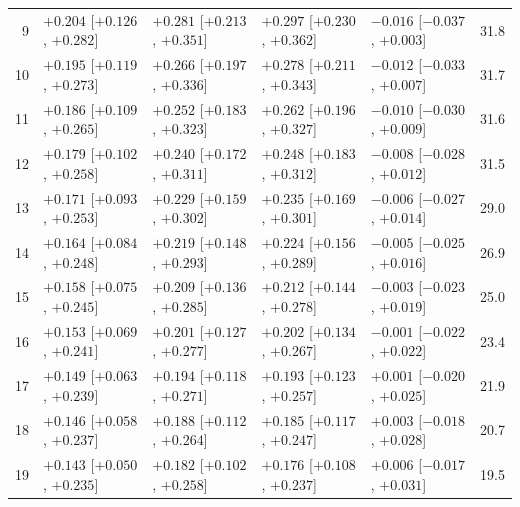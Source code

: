 \begin{longtable}{rllllr}
9 & $+0.204$ {\scriptsize [$+0.126$, $+0.282$]} & $+0.281$ {\scriptsize [$+0.213$, $+0.351$]} & $+0.297$ {\scriptsize [$+0.230$, $+0.362$]} & $-0.016$ {\scriptsize [$-0.037$, $+0.003$]} & 31.8 \\
10 & $+0.195$ {\scriptsize [$+0.119$, $+0.273$]} & $+0.266$ {\scriptsize [$+0.197$, $+0.336$]} & $+0.278$ {\scriptsize [$+0.211$, $+0.343$]} & $-0.012$ {\scriptsize [$-0.033$, $+0.007$]} & 31.7 \\
11 & $+0.186$ {\scriptsize [$+0.109$, $+0.265$]} & $+0.252$ {\scriptsize [$+0.183$, $+0.323$]} & $+0.262$ {\scriptsize [$+0.196$, $+0.327$]} & $-0.010$ {\scriptsize [$-0.030$, $+0.009$]} & 31.6 \\
12 & $+0.179$ {\scriptsize [$+0.102$, $+0.258$]} & $+0.240$ {\scriptsize [$+0.172$, $+0.311$]} & $+0.248$ {\scriptsize [$+0.183$, $+0.312$]} & $-0.008$ {\scriptsize [$-0.028$, $+0.012$]} & 31.5 \\
13 & $+0.171$ {\scriptsize [$+0.093$, $+0.253$]} & $+0.229$ {\scriptsize [$+0.159$, $+0.302$]} & $+0.235$ {\scriptsize [$+0.169$, $+0.301$]} & $-0.006$ {\scriptsize [$-0.027$, $+0.014$]} & 29.0 \\
14 & $+0.164$ {\scriptsize [$+0.084$, $+0.248$]} & $+0.219$ {\scriptsize [$+0.148$, $+0.293$]} & $+0.224$ {\scriptsize [$+0.156$, $+0.289$]} & $-0.005$ {\scriptsize [$-0.025$, $+0.016$]} & 26.9 \\
15 & $+0.158$ {\scriptsize [$+0.075$, $+0.245$]} & $+0.209$ {\scriptsize [$+0.136$, $+0.285$]} & $+0.212$ {\scriptsize [$+0.144$, $+0.278$]} & $-0.003$ {\scriptsize [$-0.023$, $+0.019$]} & 25.0 \\
16 & $+0.153$ {\scriptsize [$+0.069$, $+0.241$]} & $+0.201$ {\scriptsize [$+0.127$, $+0.277$]} & $+0.202$ {\scriptsize [$+0.134$, $+0.267$]} & $-0.001$ {\scriptsize [$-0.022$, $+0.022$]} & 23.4 \\
17 & $+0.149$ {\scriptsize [$+0.063$, $+0.239$]} & $+0.194$ {\scriptsize [$+0.118$, $+0.271$]} & $+0.193$ {\scriptsize [$+0.123$, $+0.257$]} & $+0.001$ {\scriptsize [$-0.020$, $+0.025$]} & 21.9 \\
18 & $+0.146$ {\scriptsize [$+0.058$, $+0.237$]} & $+0.188$ {\scriptsize [$+0.112$, $+0.264$]} & $+0.185$ {\scriptsize [$+0.117$, $+0.247$]} & $+0.003$ {\scriptsize [$-0.018$, $+0.028$]} & 20.7 \\
19 & $+0.143$ {\scriptsize [$+0.050$, $+0.235$]} & $+0.182$ {\scriptsize [$+0.102$, $+0.258$]} & $+0.176$ {\scriptsize [$+0.108$, $+0.237$]} & $+0.006$ {\scriptsize [$-0.017$, $+0.031$]} & 19.5 \\

\end{longtable}

